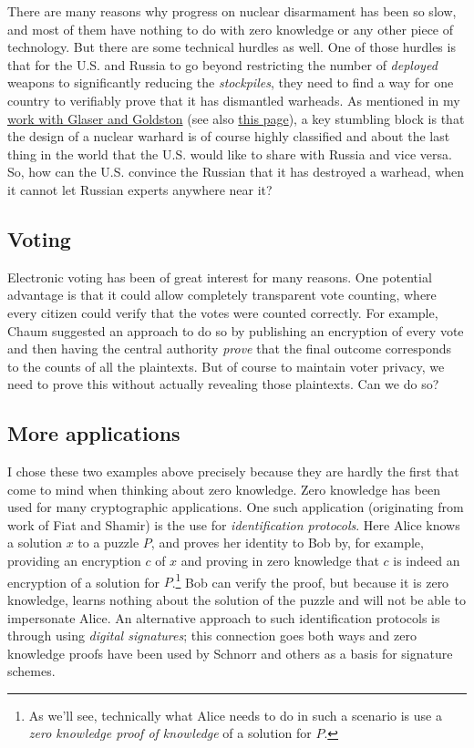 There are many reasons why progress on nuclear disarmament has been so
slow, and most of them have nothing to do with zero knowledge or any
other piece of technology. But there are some technical hurdles as well.
One of those hurdles is that for the U.S. and Russia to go beyond
restricting the number of \emph{deployed} weapons to significantly
reducing the \emph{stockpiles}, they need to find a way for one country
to verifiably prove that it has dismantled warheads. As mentioned in my
\href{http://www.nature.com/nature/journal/v510/n7506/full/nature13457.html}{work
with Glaser and Goldston} (see also
\href{http://nuclearfutures.princeton.edu/warhead-verification/}{this
page}), a key stumbling block is that the design of a nuclear warhard is
of course highly classified and about the last thing in the world that
the U.S. would like to share with Russia and vice versa. So, how can the
U.S. convince the Russian that it has destroyed a warhead, when it
cannot let Russian experts anywhere near it?

\subsection{Voting}\label{Voting}

Electronic voting has been of great interest for many reasons. One
potential advantage is that it could allow completely transparent vote
counting, where every citizen could verify that the votes were counted
correctly. For example, Chaum suggested an approach to do so by
publishing an encryption of every vote and then having the central
authority \emph{prove} that the final outcome corresponds to the counts
of all the plaintexts. But of course to maintain voter privacy, we need
to prove this without actually revealing those plaintexts. Can we do so?

\subsection{More applications}\label{More-applications}

I chose these two examples above precisely because they are hardly the
first that come to mind when thinking about zero knowledge. Zero
knowledge has been used for many cryptographic applications. One such
application (originating from work of Fiat and Shamir) is the use for
\emph{identification protocols}. Here Alice knows a solution \(x\) to a
puzzle \(P\), and proves her identity to Bob by, for example, providing
an encryption \(c\) of \(x\) and proving in zero knowledge that \(c\) is
indeed an encryption of a solution for \(P\).\footnote{As we'll see,
  technically what Alice needs to do in such a scenario is use a
  \emph{zero knowledge proof of knowledge} of a solution for \(P\).} Bob
can verify the proof, but because it is zero knowledge, learns nothing
about the solution of the puzzle and will not be able to impersonate
Alice. An alternative approach to such identification protocols is
through using \emph{digital signatures}; this connection goes both ways
and zero knowledge proofs have been used by Schnorr and others as a
basis for signature schemes.

